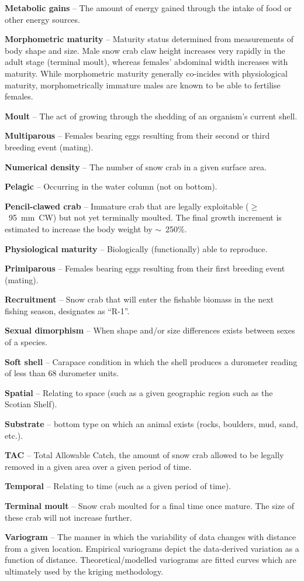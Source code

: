 \documentclass[11pt]{article}
\begin{document}
\textbf{Metabolic gains} -- The amount of energy gained through the intake of food or other energy sources.

\textbf{Morphometric maturity} -- Maturity status determined from measurements of body shape and size. Male snow crab claw height increases very rapidly in the adult stage (terminal moult), whereas females' abdominal width increases with maturity. While morphometric maturity generally co-incides with physiological maturity, morphometrically immature males are known to be able to fertilise females.

\textbf{Moult} -- The act of growing through the shedding of an organism's current shell.

\textbf{Multiparous} -- Females bearing eggs resulting from their second or third breeding event (mating).

\textbf{Numerical density} -- The number of snow crab in a given surface area.

\textbf{Pelagic} -- Occurring in the water column (not on bottom).

\textbf{Pencil-clawed crab} -- Immature crab that are legally exploitable ($\geq$~95~mm~CW) but not yet terminally moulted. The final growth increment is estimated to increase the body weight by $\sim$~250\%.

\textbf{Physiological maturity} -- Biologically (functionally) able to reproduce.

\textbf{Primiparous} -- Females bearing eggs resulting from their first breeding event (mating).

\textbf{Recruitment} -- Snow crab that will enter the fishable biomass in the next fishing season, designates as ``R-1''.

\textbf{Sexual dimorphism} -- When shape and/or size differences exists between sexes of a species.

\textbf{Soft shell} -- Carapace condition in which the shell produces a durometer reading of less than 68 durometer units.

\textbf{Spatial} -- Relating to space (such as a given geographic region such as the Scotian Shelf).

\textbf{Substrate} -- bottom type on which an animal exists (rocks, boulders, mud, sand, etc.).

\textbf{TAC} -- Total Allowable Catch, the amount of snow crab allowed to be legally removed in a given area over a given period of time.

\textbf{Temporal} -- Relating to time (such as a given period of time).

\textbf{Terminal moult} -- Snow crab moulted for a final time once mature. The size of these crab will not increase further.

\textbf{Variogram} -- The manner in which the variability of data changes with distance from a given location. Empirical variograms depict the data-derived variation as a function of distance. Theoretical/modelled variograms are fitted curves which are ultimately used by the kriging methodology.
\end{document}
